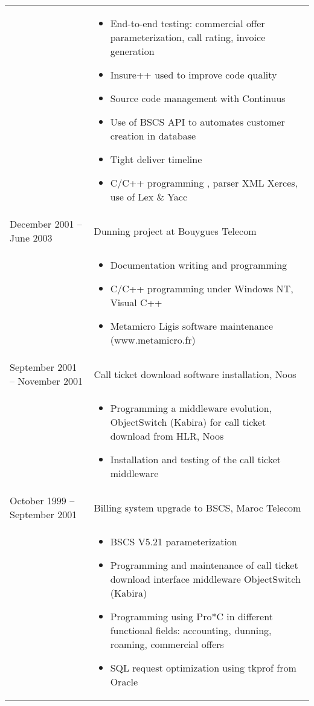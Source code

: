 \documentclass[a4paper,11pt]{article}
\begin{document}
\begin{longtable}{p{}p{}}
& \begin{itemize}
\item     End-to-end testing: commercial offer parameterization, call rating, invoice generation
\item     Insure++ used to improve code quality
\item     Source code management with Continuus
\item     Use of BSCS API to automates customer creation in database
\item     Tight deliver timeline
\item     C/C++ programming , parser XML Xerces, use of Lex \& Yacc
\end{itemize} \\
	

December 2001 -- June 2003 & Dunning project at Bouygues Telecom \\
	

& \begin{itemize}
\item     Documentation writing and programming 
\item     C/C++ programming under Windows NT, Visual C++
\item     Metamicro Ligis software maintenance (www.metamicro.fr)
\end{itemize} \\
	

September 2001 -- November 2001 & Call ticket download software installation, Noos \\

& \begin{itemize}
\item     Programming a middleware evolution, ObjectSwitch (Kabira) for call ticket download from HLR, Noos
\item     Installation and  testing of the call ticket middleware 
\end{itemize} \\


October 1999 -- September 2001 & Billing system upgrade to BSCS, Maroc Telecom \\
	

& \begin{itemize}
\item     BSCS V5.21 parameterization
\item     Programming and maintenance of call ticket download interface middleware ObjectSwitch (Kabira)
\item     Programming using Pro*C in different functional fields: accounting, dunning, roaming, commercial offers 
\item     SQL request optimization using tkprof from Oracle
\end{itemize} \\



\end{longtable}
\end{document}
